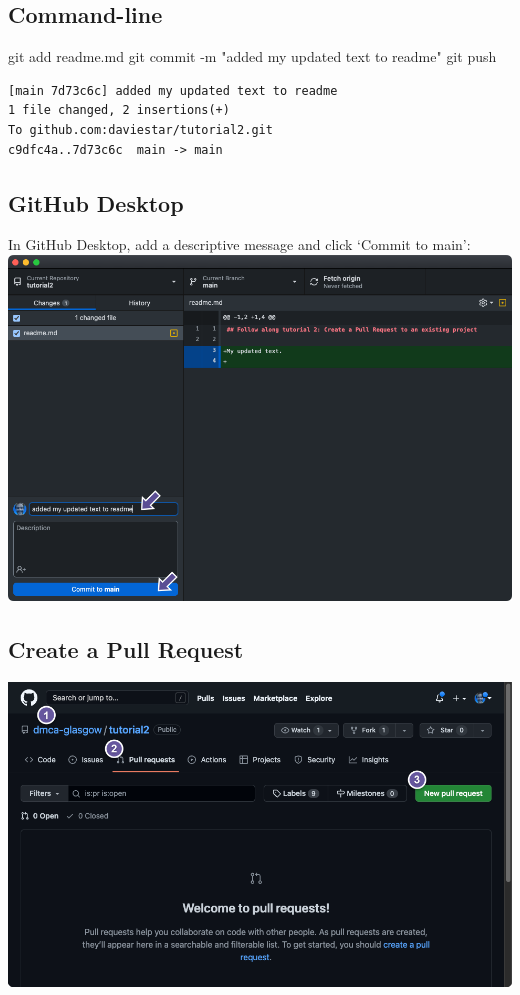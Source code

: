 \documentclass[
  letterpaper,
  DIV=11,
  numbers=noendperiod]{scrartcl}
\newenvironment{Shaded}{\begin{snugshade}}{\end{snugshade}}
\newcommand{\AttributeTok}[1]{\textcolor[rgb]{0.40,0.45,0.13}{#1}}
\newcommand{\FunctionTok}[1]{\textcolor[rgb]{0.28,0.35,0.67}{#1}}
\newcommand{\NormalTok}[1]{\textcolor[rgb]{0.00,0.23,0.31}{#1}}
\newcommand{\StringTok}[1]{\textcolor[rgb]{0.13,0.47,0.30}{#1}}
\begin{document}
\subsection{Command-line}

\begin{Shaded}
\begin{Highlighting}[]
\FunctionTok{git}\NormalTok{ add readme.md}
\FunctionTok{git}\NormalTok{ commit }\AttributeTok{{-}m} \StringTok{"added my updated text to readme"}
\FunctionTok{git}\NormalTok{ push}
\end{Highlighting}
\end{Shaded}

\begin{verbatim}
[main 7d73c6c] added my updated text to readme
1 file changed, 2 insertions(+)
To github.com:daviestar/tutorial2.git
c9dfc4a..7d73c6c  main -> main
\end{verbatim}

\subsection{GitHub Desktop}

In GitHub Desktop, add a descriptive message and click `Commit to main':
\includegraphics{images/image82.png}

\hypertarget{create-a-pull-request}{%
\subsection{Create a Pull Request}\label{create-a-pull-request}}

\includegraphics{images/image83.png}
\end{document}

